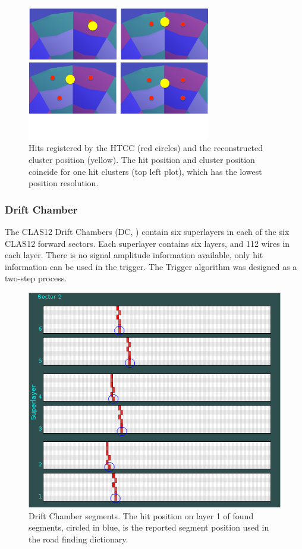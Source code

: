 \begin{figure}[htp]
	\begin{center}
		\centering
		\includegraphics[width=8cm]{img/multiHits.pdf}
		\caption{Hits registered by the HTCC (red circles) and the reconstructed cluster position (yellow). The hit position and cluster position coincide for one hit clusters (top left plot), which has the lowest position resolution.}
		\label{fig:multihitHTCC}
	\end{center}
\end{figure} 


\subsubsection{Drift Chamber}
\label{sec:DC}

The CLAS12 Drift Chambers (DC, \cite{dc-ref}) contain six superlayers in each of the six CLAS12 forward sectors. Each superlayer contains six layers, and 112 wires in each layer. There is no signal amplitude information available, only hit information can be used in the trigger. The Trigger algorithm was designed as a two-step process.

\begin{figure}[hbt]
	\centering
	\includegraphics[width=1.0\columnwidth,keepaspectratio]{img/dc_segments.png}
	\caption{Drift Chamber segments. The hit position on layer 1 of found segments, circled in blue, is the reported segment position used in the road finding dictionary.}
	\label{fig:dc_segments}
\end{figure}

